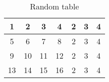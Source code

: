 \begin{table}
\centering
\caption{Random table}
\label{tab: sample}
\begin{tabular}{|c|c|c|c|c|c|c|}
\hline 
1 & 2 & 3 & 4 & 2 & 3 & 4 \\ \hline 
5 & 6 & 7 & 8 & 2 & 3 & 4 \\ \hline 
9 & 10 & 11 & 12 & 2 & 3 & 4\\ \hline 
13 & 14 & 15 & 16 & 2 & 3 & 4\\ \hline 
\end{tabular} 
\end{table}
